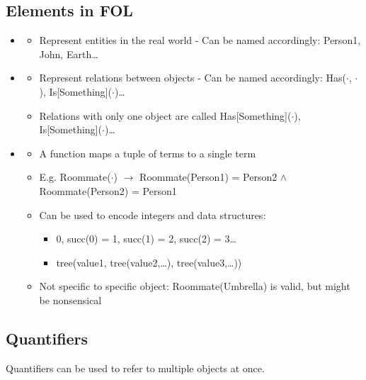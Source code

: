 \documentclass[
../EiKI_Summary.tex,
]
{subfiles}
\begin{document}
\subsection{Elements in FOL}
\begin{itemize}
    \item {}
    \begin{itemize}
        \item Represent entities in the real world - Can be named accordingly: Person1, John, Earth\dots
    \end{itemize}
    \item {}
    \begin{itemize}
        \item Represent relations between objects - Can be named accordingly: Has($\cdot$, $\cdot$), Is[Something]($\cdot$)\dots
        \item Relations with only one object are called  Has[Something]($\cdot$), Is[Something]($\cdot$)\dots
    \end{itemize}
    \item {}
    \begin{itemize}
        \item A function maps a tuple of terms to a single term
        \item E.g. Roommate($\cdot$) $\rightarrow$ Roommate(Person1) = Person2 $\land$ Roommate(Person2) = Person1
        \item Can be used to encode integers and data structures:
        \begin{itemize}
            \item 0, succ(0) = 1, succ(1) = 2, succ(2) = 3\dots
            \item tree(value1, tree(value2,\dots), tree(value3,\dots))
        \end{itemize}
        \item Not specific to specific object: Roommate(Umbrella) is valid, but might be nonsensical
    \end{itemize}
\end{itemize}

\subsection{Quantifiers}
Quantifiers can be used to refer to multiple objects at once.
\end{document}
